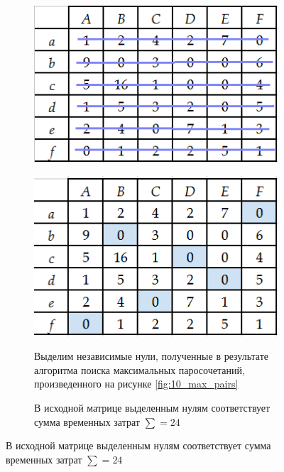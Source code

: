 \documentclass{article}
\begin{document}
\begin{enumerate}
\begin{figure}[ht]
\begin{subfigure}[b]{0.3\textwidth}
         \includegraphics[width=\textwidth]{attachments/10/031.png}
         \label{fig:10_031}
     \end{subfigure}
     \hfill
     \begin{subfigure}[b]{0.3\textwidth}
         \centering
         \caption*{\small{Выделим независимые нули, полученные в результате алгоритма поиска максимальных паросочетаний, произведенного на рисунке \ref{fig:10_max_pairs}}}
         \includegraphics[width=\textwidth]{attachments/10/04.png}
         \label{fig:10_04}
     \end{subfigure}
     \hfill
     \begin{subfigure}[b]{0.3\textwidth}
         \centering
         \caption*{\small{В исходной матрице выделенным нулям соответствует сумма временных затрат $\sum = 24$}}

\end{subfigure}
\end{figure}
\end{enumerate}
\end{document}
